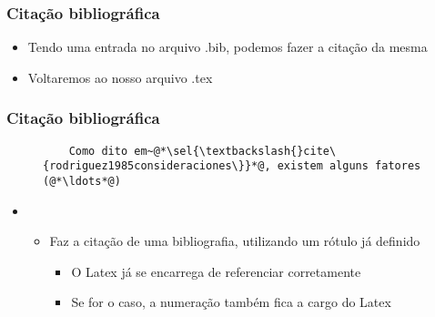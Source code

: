 \begin{frame}[fragile] \frametitle{Citação bibliográfica}
\begin{itemize}
	\item Tendo uma entrada no arquivo .bib, podemos fazer a citação da mesma
	\item Voltaremos ao nosso arquivo .tex
\end{itemize}
\end{frame}

\begin{frame}[fragile] \frametitle{Citação bibliográfica}
\begin{figure}[!t]
\begin{lstlisting}
	Como dito em~@*\sel{\textbackslash{}cite\{rodriguez1985consideraciones\}}*@, existem alguns fatores (@*\ldots*@)
\end{lstlisting}
\end{figure}

\begin{itemize}
	\item {}
	\begin{itemize}
		\item Faz a citação de uma bibliografia, utilizando um rótulo já definido
		\begin{itemize}
			\item O Latex já se encarrega de referenciar corretamente
			\item Se for o caso, a numeração também fica a cargo do Latex
		\end{itemize}
	\end{itemize}
\end{itemize}
\end{frame}